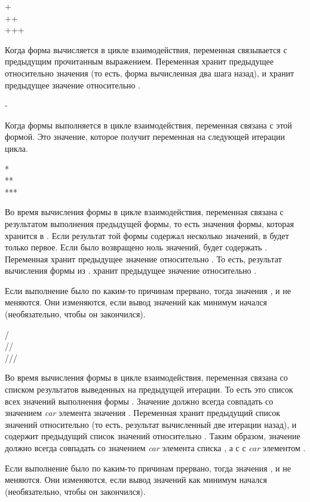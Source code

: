 \begin{defun}[Переменная]
+ \\
++ \\
+++ 

Когда форма вычисляется в цикле взаимодействия, переменная \cdf{+} связывается с
предыдущим прочитанным выражением.
Переменная \cdf{++} хранит предыдущее относительно значения \cdf{+} (то есть,
форма вычисленная два шага назад), и \cdf{+++} хранит предыдущее значение
относительно \cdf{++}.
\end{defun}

\begin{defun}[Переменная]
-

Когда формы выполняется в цикле взаимодействия, переменная \cdf{-} связана с
этой формой. Это значение, которое получит переменная \cdf{+} на следующей
итерации цикла.
\end{defun}

\begin{defun}[Переменная]
* \\
** \\
***

Во время вычисления формы в цикле взаимодействия, переменная \cdf{*} связана с
результатом выполнения предыдущей формы, то есть значения формы, которая
хранится в \cdf{+}.
Если результат той формы содержал несколько значений, в \cdf{*} будет только
первое. Если было возвращено ноль значений, \cdf{*} будет содержать {\nil}.
Переменная \cdf{**} хранит предыдущее значение относительно \cdf{*}. То есть,
результат вычисления формы из \cdf{**}. \cdf{***} хранит предыдущее значение
относительно \cdf{***}.

Если выполнение \cdf{+} было по каким-то причинам прервано, тогда значения
\cdf{*}, \cdf{**} и \cdf{***} не меняются.
Они изменяются, если вывод значений как минимум начался (необязательно, чтобы он
закончился).
\end{defun}

\begin{defun}[Переменная]
/ \\
// \\
///

Во время вычисления формы в цикле взаимодействия,
переменная \cdf{/} связана со списком результатов выведенных на предыдущей
итерации. То есть это список всех значений выполнения формы \cdf{+}.
Значение \cdf{*} должно всегда совпадать со значением \emph{car} элемента
значения \cdf{/}.
Переменная \cdf{//} хранит предыдущий список значений относительно \cdf{/} (то
есть, результат вычисленный две итерации назад), и \cdf{///} содержит предыдущий
список значений относительно \cdf{///}. Таким образом, значение \cdf{**} должно
всегда совпадать со значением \emph{car} элемента списка \cdf{//}, а \cdf{***} с
с \emph{car} элементом \cdf{///}. 

Если выполнение \cdf{+} было по каким-то причинам прервано, тогда значения
\cdf{/}, \cdf{//} и \cdf{///} не меняются.
Они изменяются, если вывод значений как минимум начался (необязательно, чтобы он
закончился).
\end{defun}

